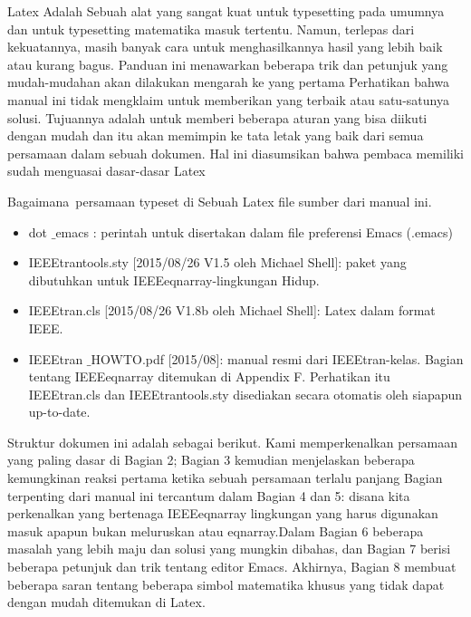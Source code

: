 \sloppy
 \hspace*{0.5in} Latex Adalah Sebuah alat yang sangat kuat untuk typesetting pada umumnya dan untuk typesetting matematika masuk tertentu. Namun, terlepas dari kekuatannya, masih banyak cara untuk menghasilkannya hasil yang lebih baik atau kurang bagus. Panduan ini menawarkan beberapa trik dan petunjuk yang mudah-mudahan akan dilakukan mengarah ke yang pertama Perhatikan bahwa manual ini tidak mengklaim untuk memberikan yang terbaik atau satu-satunya solusi. Tujuannya adalah untuk memberi beberapa aturan yang bisa diikuti dengan mudah dan itu akan memimpin ke tata letak yang baik dari semua persamaan dalam sebuah dokumen. Hal ini diasumsikan bahwa pembaca memiliki sudah menguasai dasar-dasar Latex \par
\noindent 
\vspace{12pt}
\noindent 
\vspace{12pt}
\noindent 
Bagaimana~persamaan typeset di  Sebuah Latex file sumber dari manual ini. \par
\noindent 
\vspace{12pt}
\noindent 
\begin{itemize}
\item dot $  \_  $emacs : perintah untuk disertakan dalam file preferensi Emacs (.emacs) \par
\noindent 
\item IEEEtrantools.sty [2015/08/26 V1.5 oleh Michael Shell]: paket yang dibutuhkan untuk IEEEeqnarray-lingkungan Hidup. \par
\noindent 
\item IEEEtran.cls [2015/08/26 V1.8b oleh Michael Shell]: Latex dalam format IEEE. \par
\noindent 
\item IEEEtran $  \_  $HOWTO.pdf [2015/08]: manual resmi dari IEEEtran-kelas. Bagian tentang IEEEeqnarray ditemukan di Appendix F. Perhatikan itu IEEEtran.cls dan IEEEtrantools.sty disediakan secara otomatis oleh siapapun up-to-date.\end{itemize}
 \par
\noindent 
\vspace{12pt}
\noindent 
 \hspace*{0.5in} Struktur dokumen ini adalah sebagai berikut. Kami memperkenalkan persamaan yang paling dasar di Bagian 2; Bagian 3 kemudian menjelaskan beberapa kemungkinan reaksi pertama ketika sebuah persamaan terlalu panjang Bagian terpenting dari manual ini tercantum dalam Bagian 4 dan 5: disana kita perkenalkan yang bertenaga IEEEeqnarray lingkungan yang harus digunakan masuk apapun bukan meluruskan atau eqnarray.Dalam Bagian 6 beberapa masalah yang lebih maju dan solusi yang mungkin dibahas, dan Bagian 7 berisi beberapa petunjuk dan trik tentang editor Emacs. Akhirnya, Bagian 8 membuat beberapa saran tentang beberapa simbol matematika khusus yang tidak dapat dengan mudah ditemukan di Latex. \par
